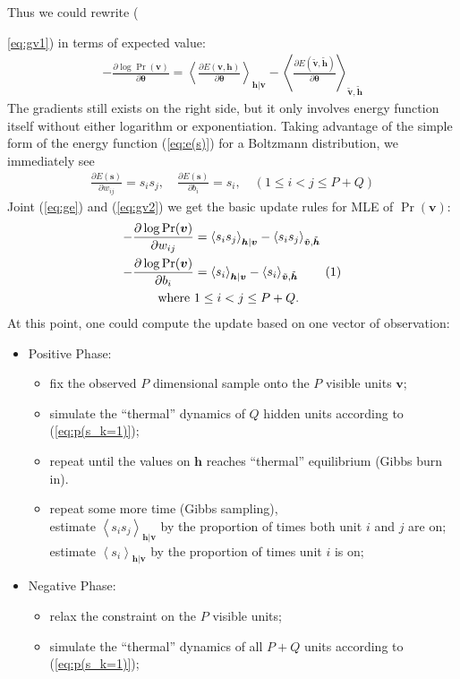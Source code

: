 \documentclass[11pt]{article}
\newcommand{\mean}[2]{\left\langle{#1}\right\rangle_{#2}}
\newcommand\numberthis{\addtocounter{equation}{1}\tag{\theequation}}
\newcommand{\vh}{\boldsymbol{h}}
\newcommand{\vv}{\boldsymbol{v}}
\newcommand{\vs}{\boldsymbol{s}}
\newcommand{\vht}{\tilde{\vh}}
\newcommand{\vvt}{\tilde{\vv}}
\newcommand{\pEC}{\boldsymbol{\theta}}
\newcommand{\PDV}[2]{\frac{\partial #1}{\partial #2}}
\begin{document}
Thus we could rewrite ({\ref{eq:gv1}) in terms of expected value:
\begin{align} \label{eq:gv2}
  -\PDV{\log{\Pr(\vv)}}{\pEC} = \mean{\PDV{E(\vv, \vh)}{\pEC}}{\vh|\vv} - \mean{\PDV{E(\vvt, \vht)}{\pEC}}{\vvt, \vht}
\end{align}
The gradients still exists on the right side, but it only involves energy function itself without either logarithm or exponentiation. Taking advantage of the simple form of the energy function (\ref{eq:e(s)}) for a Boltzmann distribution, we immediately see
\begin{align} \label{eq:ge}
  \PDV{E(\vs)}{w_{ij}} = s_i s_j,  \quad \PDV{E(\vs)}{b_i} = s_i, \quad  (1 \le i < j \le P+Q)
\end{align}
Joint (\ref{eq:ge}) and (\ref{eq:gv2}) we get the basic update rules for MLE of $\Pr(\vv)$:
\begin{align*} \label{eq:gv3}
  -\PDV{\log{\Pr(\vv)}}{w_{ij}} &= \mean{s_i s_j}{\vh|\vv} - \mean{s_i s_j}{\vvt, \vht} \\
  -\PDV{\log{\Pr(\vv)}}{b_i}    &= \mean{s_i}{\vh|\vv} - \mean{s_i}{\vvt, \vht} \numberthis \\
  \textrm{where }               & 1 \le i < j \le P+Q.
\end{align*}
At this point, one could compute the update based on one vector of observation:
\begin{itemize}
\item Positive Phase:
  \begin{itemize}
  \item fix the observed $P$ dimensional sample onto the $P$ visible units $\vv$;
  \item simulate the ``thermal'' dynamics of $Q$ hidden units according to (\ref{eq:p(s_k=1)});
  \item repeat until the values on $\vh$ reaches ``thermal'' equilibrium (Gibbs burn in).
  \item repeat some more time (Gibbs sampling), \\
    estimate $\mean{s_i s_j}{\vh|\vv}$ by the proportion of times both unit $i$ and $j$ are on; \\
    estimate $\mean{s_i}{\vh|\vv}$ by the proportion of times unit $i$ is on;
  \end{itemize}
\item Negative Phase:
  \begin{itemize}
  \item relax the constraint on the $P$ visible units;
  \item simulate the ``thermal'' dynamics of all $P + Q$ units according to (\ref{eq:p(s_k=1)});

\end{itemize}
\end{itemize}}
\end{document}
